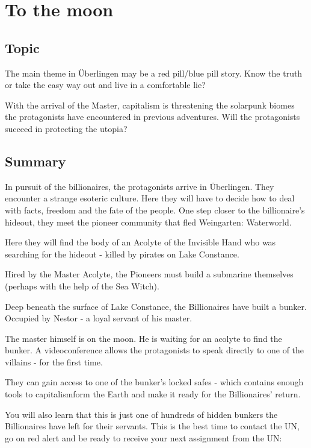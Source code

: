 
\chapter{To the moon}
\label{ch:To the moon}

\section{Topic}

The main theme in Überlingen may be a red pill/blue pill story. Know the truth or take the easy way out and live in a comfortable lie?

With the arrival of the Master, capitalism is threatening the solarpunk biomes the protagonists have encountered in previous adventures. Will the protagonists succeed in protecting the utopia?

\section{Summary}

In pursuit of the billionaires, the protagonists arrive in Überlingen. They encounter a strange esoteric culture. Here they will have to decide how to deal with facts, freedom and the fate of the people.
One step closer to the billionaire's hideout, they meet the pioneer community that fled Weingarten: Waterworld.

Here they will find the body of an Acolyte of the Invisible Hand who was searching for the hideout - killed by pirates on Lake Constance.

Hired by the Master Acolyte, the Pioneers must build a submarine themselves (perhaps with the help of the Sea Witch).

Deep beneath the surface of Lake Constance, the Billionaires have built a bunker. Occupied by Nestor - a loyal servant of his master.

The master himself is on the moon. He is waiting for an acolyte to find the bunker. A videoconference allows the protagonists to speak directly to one of the villains - for the first time.

They can gain access to one of the bunker's locked safes - which contains enough tools to capitalismform the Earth and make it ready for the Billionaires' return.

You will also learn that this is just one of hundreds of hidden bunkers the Billionaires have left for their servants. This is the best time to contact the UN, go on red alert and be ready to receive your next assignment from the UN:

